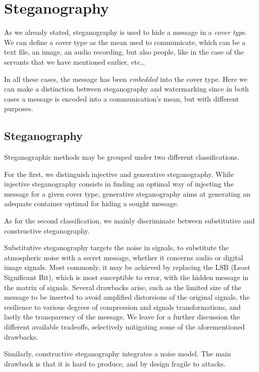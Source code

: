 \documentclass[../../main.tex]{subfiles}
\begin{document}
\section{Steganography}

As we already stated, steganography is used to hide a message in a
\emph{cover type}. We can define a cover type as the mean used to communicate,
which can be a text file, an image, an audio recording, but also people, like in
the case of the servants that we have mentioned earlier, etc\dots

In all these cases, the message has been \emph{embedded} into the cover type.
Here we can make a distinction between steganography and watermarking since in
both cases a message is encoded into a communication's mean, but with different
purposes.

\subsection{Steganography}

Steganographic methods may be grouped under two different classifications.

For the first, we distinguish injective and generative steganography.
While injective steganography consists in finding an optimal way of injecting
the message for a given cover type, generative steganography aims at generating
an adequate container optimal for hiding a sought message.

As for the second classification, we mainly discriminate between substitutive
and constructive steganography.

Substitutive steganography targets the noise in signals, to substitute the
atmospheric noise with a secret message, whether it concerns audio or digital
image signals.
Most commonly, it may be achieved by replacing the LSB (Least Significant Bit),
which is most susceptible to error, with the hidden message in the matrix of
signals.
Several drawbacks arise, such as the limited size of the message to be inserted
to avoid amplified distorsions of the original signals, the resilience to
various degrees of compression and signals transformations, and lastly the
transparency of the message.
We leave for a further discussion the different available tradeoffs, selectively
mitigating some of the aforementioned drawbacks. 

Similarly, constructive steganography integrates a noise model.
The main drawback is that it is hard to produce, and by design fragile to
attacks.
\end{document}
